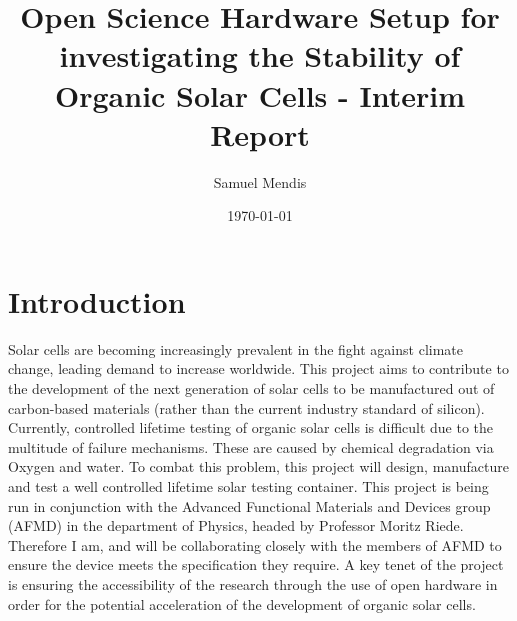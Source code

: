 \documentclass[a4paper,11pt]{article}
\begin{document}
\title{Open Science Hardware Setup for investigating the Stability of Organic Solar Cells - Interim Report}
\author{Samuel Mendis}
\date{\today}
\maketitle
\pagebreak
\section{Introduction}
Solar cells are becoming increasingly prevalent in the fight against climate change\cite[p.~34]{RN49}, leading demand to increase worldwide. This project aims to contribute to the development of the next generation of solar cells to be manufactured out of carbon-based materials (rather than the current industry standard of silicon). Currently, controlled lifetime testing of organic solar cells is difficult due to the multitude of failure mechanisms. These are caused by chemical degradation via Oxygen and water\cite[p.~689]{RN38}. To combat this problem, this project will design, manufacture and test a well controlled lifetime solar testing container. This project is being run in conjunction with the Advanced Functional Materials and Devices group (AFMD) in the department of Physics, headed by Professor Moritz Riede. Therefore I am, and will be collaborating closely with the members of AFMD to ensure the device meets the specification they require. A key tenet of the project is ensuring the accessibility of the research through the use of open hardware in order for the  potential acceleration of the development of organic solar cells.
\end{document}
